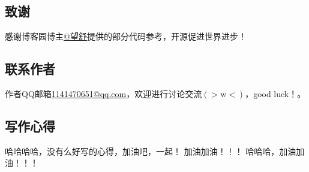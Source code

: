 \documentclass[12pt,a4,utf8]{article}
\begin{document}
\newpage
\subsection{致谢}
感谢博客园博主\href{https://www.cnblogs.com/huangliu1111/p/13625826.html}{@望舒}提供的部分代码参考，开源促进世界进步！
\subsection{联系作者}
作者QQ邮箱\href{https://wx.mail.qq.com/?cancel_login=true&from=get_ticket_fail}{1141470651@qq.com}，欢迎进行讨论交流$(>\text{w}<)$，good luck！。

\subsection{写作心得}
哈哈哈哈，没有么好写的心得，加油吧，一起！
加油加油！！！
哈哈哈，加油加油！！！

\end{document}
